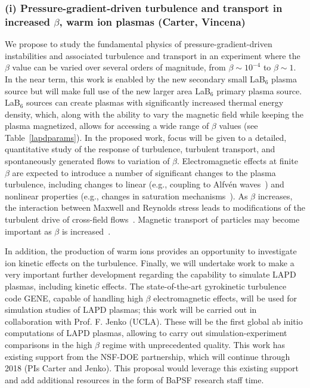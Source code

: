 \documentclass[11pt]{article}
\renewcommand{\cite}{\citep}
\begin{document}
\subsubsection{(i) Pressure-gradient-driven turbulence and transport in increased $\beta$, warm ion
  plasmas (Carter, Vincena) } 

We propose to study the fundamental physics of
pressure-gradient-driven instabilities and associated turbulence and
transport in an experiment where the $\beta$ value can be varied over
several orders of magnitude, from $\beta\sim 10^{-4}$ to $\beta\sim
1$. In the near term, this work is enabled by the new secondary small
LaB$_6$ plasma source but will make full use of the new larger area
LaB$_6$ primary plasma source. LaB$_6$ sources can create plasmas with
significantly increased thermal energy density, which, along with the
ability to vary the magnetic field while keeping the plasma
magnetized, allows for accessing a wide range of $\beta$ values (see
Table~\ref{lapdparams}). In the proposed work, focus will be given to
a detailed, quantitative study of the response of turbulence,
turbulent transport, and spontaneously generated flows to variation of
$\beta$. Electromagnetic effects at finite $\beta$ are expected to
introduce a number of significant changes to the plasma turbulence,
including changes to linear (e.g., coupling to Alfv\'{e}n
waves~\cite{dalf99,morales99,burke00,zweben79}) and nonlinear
properties (e.g., changes in saturation
mechanisms~\cite{ppcf01,em1,em2}).  As $\beta$ increases, the
interaction between Maxwell and Reynolds stress leads to modifications
of the turbulent drive of cross-field
flows~\cite{stress1,stress2}. Magnetic transport of particles may
become important as $\beta$ is increased~\cite{liewer85,stoneking94}.  

In addition, the production of warm ions provides an opportunity to
investigate ion kinetic effects on the turbulence.  Finally, we will
undertake work to make a very important further development regarding
the capability to simulate LAPD plasmas, including kinetic
effects. The state-of-the-art gyrokinetic turbulence code GENE,
capable of handling high $\beta$ electromagnetic effects, will be used
for simulation studies of LAPD plasmas; this work will be carried out
in collaboration with Prof. F. Jenko (UCLA). These will be the first
global ab initio computations of LAPD plasmas, allowing to carry out
simulation-experiment comparisons in the high $\beta$ regime with
unprecedented quality.  This work has existing support from the
NSF-DOE partnership, which will continue through 2018 (PIs Carter and Jenko). This proposal would
leverage this existing support and add additional resources in the
form of BaPSF research staff time.
\end{document}
